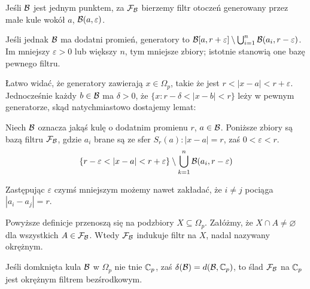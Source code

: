 Jeśli $\mathcal B$ jest jednym punktem, za $\mathcal F_\mathcal B$ bierzemy filtr otoczeń generowany przez małe kule wokół $a$, $\mathcal B(a, \varepsilon)$.

Jeśli jednak $\mathcal B$ ma dodatni promień, generatory to $\mathcal B[a, r + \varepsilon] \setminus \bigcup_{i=1}^n \mathcal B (a_i, r - \varepsilon)$.
Im mniejszy $\varepsilon > 0$ lub większy $n$, tym mniejsze zbiory; istotnie stanowią one bazę pewnego filtru.

Łatwo widać, że generatory zawierają $x \in \Omega_p$, takie że jest $r < |x-a| < r + \varepsilon$.
Jednocześnie każdy $b \in \mathcal B$ ma $\delta > 0$, że $\{x : r - \delta < |x - b| <r\}$ leży w pewnym generatorze, skąd natychmiastowo dostajemy lemat:

\begin{lemat}
	Niech $\mathcal B$ oznacza jakąś kulę o dodatnim promienu $r$, $a \in \mathcal B$.
	Poniższe zbiory są bazą filtru $\mathcal F_\mathcal B$, gdzie $a_i$ brane są ze sfer $S_r(a) : |x - a| = r$, zaś $0 < \varepsilon < r$.
	\[
		\left\{ r-\varepsilon < |x-a| < r+\varepsilon\right\} \setminus \bigcup_{k = 1}^n \mathcal B(a_i, r - \varepsilon)
	\]
\end{lemat}

Zastępując $\varepsilon$ czymś mniejszym możemy nawet zakładać, że $i \neq j$ pociąga $|a_i - a_j| = r$.

Powyższe definicje przenoszą się na podzbiory $X \subseteq \Omega_p$.
Załóżmy, że $X \cap A \neq \varnothing$  dla wszystkich $A \in \mathcal F_\mathcal B$.
Wtedy $\mathcal F_\mathcal B$ indukuje filtr na $X$, nadal nazywany okrężnym.

\begin{przyklad}[$X=\C_p$]
	Jeśli domknięta kula $\mathcal B$ w $\Omega_p$ nie tnie $\mathbb C_p$, zaś $\delta(\mathcal B) = d(\mathcal B, \mathbb C_p)$, to ślad $\mathcal F_\mathcal B$ na $\mathbb C_p$ jest okrężnym filtrem bezśrodkowym.
\end{przyklad}
